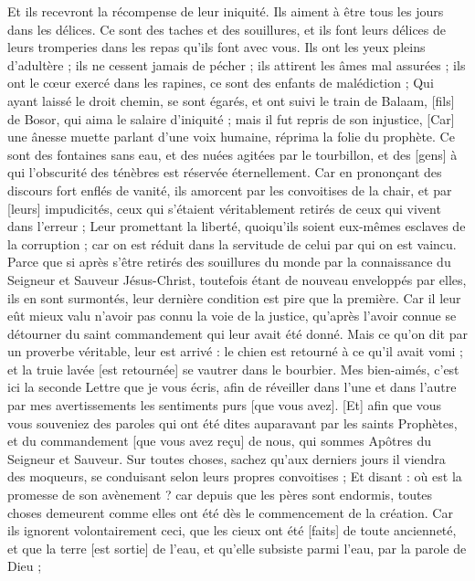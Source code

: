 \begin{multicols}{2}
Et ils recevront la récompense de leur iniquité. Ils aiment à être tous les jours dans les délices. Ce sont des taches et des souillures, et ils font leurs délices de leurs tromperies dans les repas qu'ils font avec vous.
Ils ont les yeux pleins d'adultère ; ils ne cessent jamais de pécher ; ils attirent les âmes mal assurées ; ils ont le cœur exercé dans les rapines, ce sont des enfants de malédiction ;
Qui ayant laissé le droit chemin, se sont égarés, et ont suivi le train de Balaam, [fils] de Bosor, qui aima le salaire d'iniquité ; mais il fut repris de son injustice,
[Car] une ânesse muette parlant d'une voix humaine, réprima la folie du prophète.
Ce sont des fontaines sans eau, et des nuées agitées par le tourbillon, et des [gens] à qui l'obscurité des ténèbres est réservée éternellement.
Car en prononçant des discours fort enflés de vanité, ils amorcent par les convoitises de la chair, et par [leurs] impudicités, ceux qui s'étaient véritablement retirés de ceux qui vivent dans l'erreur ;
Leur promettant la liberté, quoiqu'ils soient eux-mêmes esclaves de la corruption ; car on est réduit dans la servitude de celui par qui on est vaincu.
Parce que si après s'être retirés des souillures du monde par la connaissance du Seigneur et Sauveur Jésus-Christ, toutefois étant de nouveau enveloppés par elles, ils en sont surmontés, leur dernière condition est pire que la première.
Car il leur eût mieux valu n'avoir pas connu la voie de la justice, qu'après l'avoir connue se détourner du saint commandement qui leur avait été donné.
Mais ce qu'on dit par un proverbe véritable, leur est arrivé : le chien est retourné à ce qu'il avait vomi ; et la truie lavée [est retournée] se vautrer dans le bourbier.
\VerseOne{}Mes bien-aimés, c'est ici la seconde Lettre que je vous écris, afin de réveiller dans l'une et dans l'autre par mes avertissements les sentiments purs [que vous avez].
[Et] afin que vous vous souveniez des paroles qui ont été dites auparavant par les saints Prophètes, et du commandement [que vous avez reçu] de nous, qui sommes Apôtres du Seigneur et Sauveur.
Sur toutes choses, sachez qu'aux derniers jours il viendra des moqueurs, se conduisant selon leurs propres convoitises ;
Et disant : où est la promesse de son avènement ? car depuis que les pères sont endormis, toutes choses demeurent comme elles ont été dès le commencement de la création.
Car ils ignorent volontairement ceci, que les cieux ont été [faits] de toute ancienneté, et que la terre [est sortie] de l'eau, et qu'elle subsiste parmi l'eau, par la parole de Dieu ;

\end{multicols}
